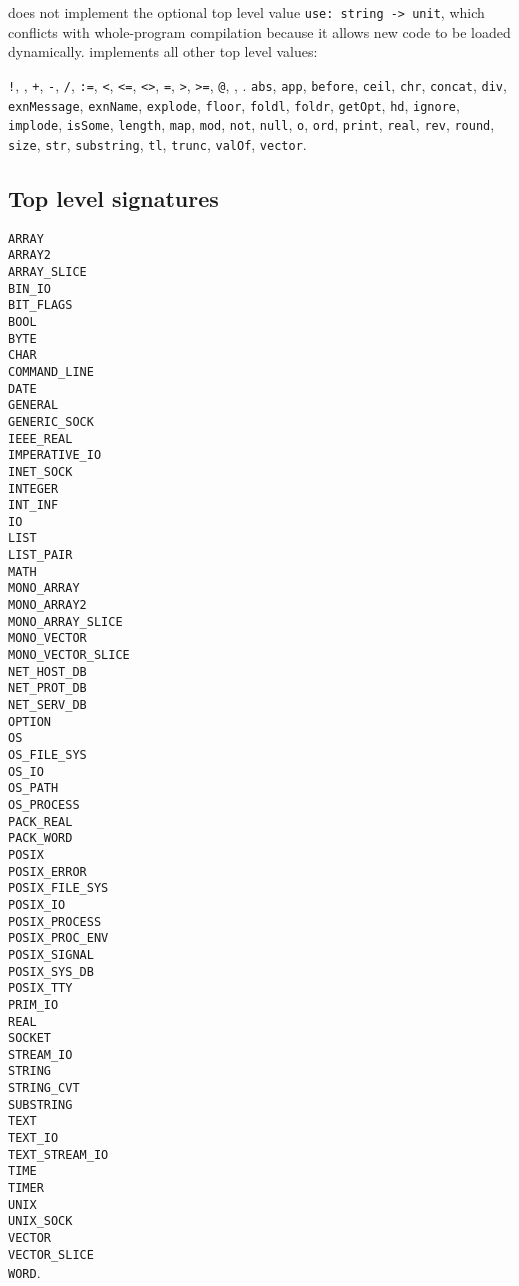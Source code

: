 {\mlton} does not implement the optional top level value
\verb+use: string -> unit+, which conflicts with whole-program
compilation because it allows new code to be loaded dynamically.
{\mlton} implements all other top level values:

{\tt !},
{\tt *},
{\tt +},
{\tt -},
{\tt /},
{\tt :=},
{\tt <},
{\tt <=},
{\tt <>},
{\tt =},
{\tt >},
{\tt >=},
{\tt @},
{\tt {}},
{\tt {}}.
{\tt abs},
{\tt app},
{\tt before},
{\tt ceil},
{\tt chr},
{\tt concat},
{\tt div},
{\tt exnMessage},
{\tt exnName},
{\tt explode},
{\tt floor},
{\tt foldl},
{\tt foldr},
{\tt getOpt},
{\tt hd},
{\tt ignore},
{\tt implode},
{\tt isSome},
{\tt length},
{\tt map},
{\tt mod},
{\tt not},
{\tt null},
{\tt o},
{\tt ord},
{\tt print},
{\tt real},
{\tt rev},
{\tt round},
{\tt size},
{\tt str},
{\tt substring},
{\tt tl},
{\tt trunc},
{\tt valOf},
{\tt vector}.
%
\newcommand{\signature}[1]{{\tt #1}\\}
\subsection{Top level signatures}
\signature{ARRAY}
\signature{ARRAY2}
\signature{ARRAY\_SLICE}
\signature{BIN\_IO}
\signature{BIT\_FLAGS}
\signature{BOOL}
\signature{BYTE}
\signature{CHAR}
\signature{COMMAND\_LINE}
\signature{DATE}
\signature{GENERAL}
\signature{GENERIC\_SOCK}
\signature{IEEE\_REAL}
\signature{IMPERATIVE\_IO}
\signature{INET\_SOCK}
\signature{INTEGER}
\signature{INT\_INF}
\signature{IO}
\signature{LIST}
\signature{LIST\_PAIR}
\signature{MATH}
\signature{MONO\_ARRAY}
\signature{MONO\_ARRAY2}
\signature{MONO\_ARRAY\_SLICE}
\signature{MONO\_VECTOR}
\signature{MONO\_VECTOR\_SLICE}
\signature{NET\_HOST\_DB}
\signature{NET\_PROT\_DB}
\signature{NET\_SERV\_DB}
\signature{OPTION}
\signature{OS}
\signature{OS\_FILE\_SYS}
\signature{OS\_IO}
\signature{OS\_PATH}
\signature{OS\_PROCESS}
\signature{PACK\_REAL}
\signature{PACK\_WORD}
\signature{POSIX}
\signature{POSIX\_ERROR}
\signature{POSIX\_FILE\_SYS}
\signature{POSIX\_IO}
\signature{POSIX\_PROCESS}
\signature{POSIX\_PROC\_ENV}
\signature{POSIX\_SIGNAL}
\signature{POSIX\_SYS\_DB}
\signature{POSIX\_TTY}
\signature{PRIM\_IO}
\signature{REAL}
\signature{SOCKET}
\signature{STREAM\_IO}
\signature{STRING}
\signature{STRING\_CVT}
\signature{SUBSTRING}
\signature{TEXT}
\signature{TEXT\_IO}
\signature{TEXT\_STREAM\_IO}
\signature{TIME}
\signature{TIMER}
\signature{UNIX}
\signature{UNIX\_SOCK}
\signature{VECTOR}
\signature{VECTOR\_SLICE}
{\tt WORD}.
%
\newcommand{\fullmodule}[2]{{\tt #1: #2}\\ }
